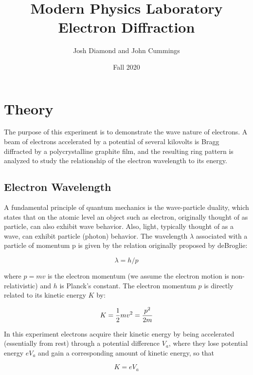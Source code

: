 \documentclass{article}
\begin{document}
\title{Modern Physics Laboratory\\
Electron Diffraction}
\author{Josh Diamond and John Cummings}
\date{Fall 2020}
\maketitle


\section{Theory}

The purpose of this experiment is to demonstrate the wave nature
of electrons. A beam of electrons accelerated by a potential of several kilovolts is Bragg
diffracted by a polycrystalline graphite film, and the resulting ring pattern is analyzed to study the
relationship of the electron wavelength to its energy.

\subsection{Electron Wavelength}

A fundamental principle of quantum mechanics is the wave-particle
duality, which states that on the atomic level an object such as
electron, originally thought of as particle, can also exhibit wave
behavior.  Also, light, typically thought of as a wave, can exhibit
particle (photon) behavior.  The wavelength $\lambda$ associated
with a particle of momentum p is given by the relation originally
proposed by deBroglie:

\begin{equation}
\lambda = h/p
\label{eq:debroglie}
\end{equation}

where $p = mv$ is the electron momentum (we assume the electron motion is
non-relativistic) and $h$ is Planck's constant.  The
electron momentum $p$ is directly related to its kinetic energy $K$ by:


\begin{equation}
K = {1 \over 2} mv^2 = {p^2 \over 2m}
\label{eq:ke}
\end{equation}

In this experiment electrons acquire their kinetic energy by being
accelerated (essentially from rest) through a potential difference
$V_a$, where they lose potential energy
$eV_a$ and gain a corresponding amount of kinetic energy,
so that

\begin{equation}
K = eV_a
\label{eq:kev}
\end{equation}
\end{document}
